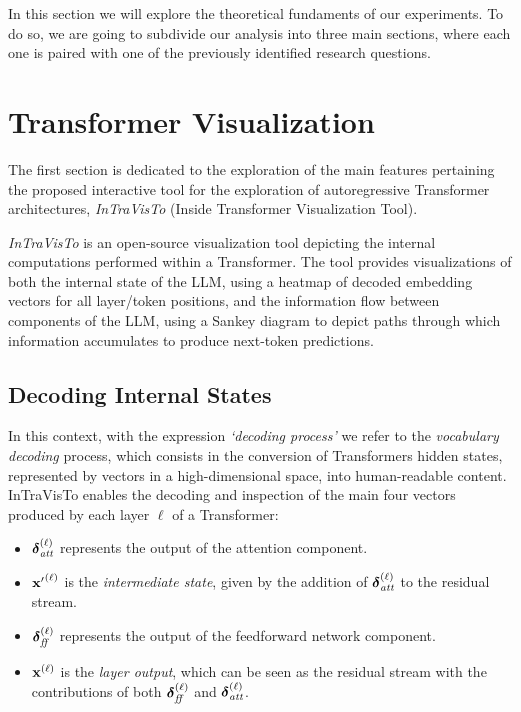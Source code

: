 In this section we will explore the theoretical fundaments of our experiments.
To do so, we are going to subdivide our analysis into three main sections, where each one is paired with one of the previously identified research questions.

\section{Transformer Visualization}\label{sec:method_intravisto}

The first section is dedicated to the exploration of the main features pertaining the proposed interactive tool for the exploration of autoregressive Transformer architectures, \emph{InTraVisTo} (Inside Transformer Visualization Tool).

\emph{InTraVisTo} is an open-source visualization tool depicting the internal computations performed within a Transformer.
The tool provides visualizations of both the internal state of the LLM, using a heatmap of decoded embedding vectors for all layer/token positions, and the information flow between components of the LLM, using a Sankey diagram to depict paths through which information accumulates to produce next-token predictions.

\subsection{Decoding Internal States}\label{ssec:method_intravisto_decoding}

In this context, with the expression \emph{`decoding process'} we refer to the \emph{vocabulary decoding} process, which consists in the conversion of Transformers hidden states, represented by vectors in a high-dimensional space, into human-readable content.
InTraVisTo enables the decoding and inspection of the main four vectors produced by each layer $\ell$ of a Transformer:
\begin{itemize}
    \item $\bm{\mathbf{\delta}}_\textit{att}^{(\ell)}$ represents the output of the attention component.
    \item ${\bm{\mathbf{x}}'}^{(\ell)}$ is the \emph{intermediate state}, given by the addition of $\bm{\mathbf{\delta}}_\textit{att}^{(\ell)}$ to the residual stream.
    \item $\bm{\mathbf{\delta}}_\textit{ff}^{(\ell)}$ represents the output of the feedforward network component.
    \item $\bm{\mathbf{x}}^{(\ell)}$ is the \emph{layer output}, which can be seen as the residual stream with the contributions of both $\bm{\mathbf{\delta}}_\textit{ff}^{(\ell)}$ and $\bm{\mathbf{\delta}}_\textit{att}^{(\ell)}$.
\end{itemize}

